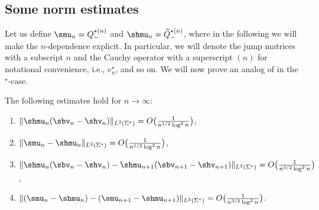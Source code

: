 \subsection{Some norm estimates}
Let us define $\smu_{n} = Q_{-}^{\star (n)}$ and $\shmu_{n} = \widehat Q_{-}^{\star (n)}$, where in the following we will make the $n$-dependence explicit. In particular, we will denote the jump matrices with a subscript $n$ and the Cauchy operator with a superscript $(n)$ for notational convenience, i.e., $v^\star_n$,  and so on. We will now prove an analog of \cite[Proposition~5.1]{CD} in the ${}^\star$-case.
\begin{Proposition}\label{PropFourInt}
The following estimates hold for $n \to \infty$:
\begin{enumerate}[$(i)$]\itemsep=0pt
 \item $\Vert \shmu_n (\sbv_n - \shv_n) \Vert_{L^2(\Sigma^\star)} = O\big(\frac{1}{n^{1/2}\log^2 n}\big)$,
 \item $\Vert \smu_n - \shmu_n \Vert_{L^2(\Sigma^\star)} = O\big(\frac{1}{n^{1/2}\log^2 n}\big)$,
 \item $\Vert \shmu_n (\sbv_n - \shv_n) - \shmu_{n+1} (\sbv_{n+1} - \shv_{n+1}) \Vert_{L^2(\Sigma^\star)} = O\big(\frac{1}{n^{3/2}\log^2 n}\big)$,
 \item $\Vert (\smu_n - \shmu_n) - (\smu_{n+1} - \shmu_{n+1}) \Vert_{L^2(\Sigma^\star)} = O\big(\frac{1}{n^{3/2}\log^2 n}\big)$.
\end{enumerate}
\end{Proposition}
